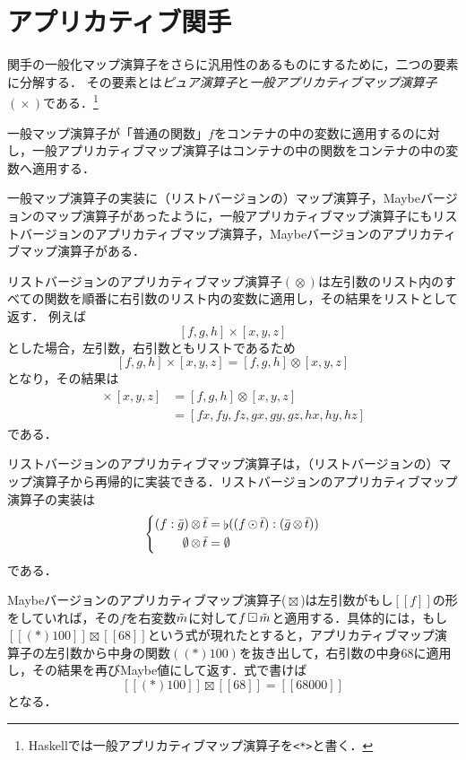 \documentclass[twocolumn]{jsbook}
\def\[{[\![}
\def\]{]\!]}
\newcommand{\keyword}[1]{{\emph{#1}}}
\newcommand{\code}[1]{\texttt{#1}}
\DeclareMathOperator{\hsklApplicativeMap}{\times}
\DeclareMathOperator{\hsklApplicativeListMap}{\otimes}
\DeclareMathOperator{\hsklApplicativeMaybeMap}{\boxtimes}
\DeclareMathOperator{\hsklConcat}{\flat}
\DeclareMathOperator{\hsklMap}{\odot}
\DeclareMathOperator{\hsklMaybeMap}{\boxdot}
\newcommand{\hsklEmptyList}{\emptyset}
\newcommand{\hsklJust}[1]{\[#1\]}
\newcommand{\hsklList}[1]{\Bar{#1}}
\newcommand{\hsklMaybe}[1]{\Tilde{#1}}
\begin{document}
\section{アプリカティブ関手}

関手の一般化マップ演算子をさらに汎用性のあるものにするために，二つの要素に分解する．
その要素とは\keyword{ピュア演算子}と\keyword{一般アプリカティブマップ演算子} $(\hsklApplicativeMap)$である．\footnote{Haskellでは一般アプリカティブマップ演算子を\code{<*>}と書く．}

一般マップ演算子が「普通の関数」$f$をコンテナの中の変数に適用するのに対し，一般アプリカティブマップ演算子はコンテナの中の関数をコンテナの中の変数へ適用する．

一般マップ演算子の実装に（リストバージョンの）マップ演算子，Maybeバージョンのマップ演算子があったように，一般アプリカティブマップ演算子にもリストバージョンのアプリカティブマップ演算子，Maybeバージョンのアプリカティブマップ演算子がある．

リストバージョンのアプリカティブマップ演算子$(\hsklApplicativeListMap)$は左引数のリスト内のすべての関数を順番に右引数のリスト内の変数に適用し，その結果をリストとして返す．
例えば$$[f,g,h]\hsklApplicativeMap[x,y,z]$$とした場合，左引数，右引数ともリストであるため$$[f,g,h]\hsklApplicativeMap[x,y,z]=[f,g,h]\hsklApplicativeListMap[x,y,z]$$となり，その結果は
\begin{align*}
[f,g,h]\hsklApplicativeMap[x,y,z]&=[f,g,h]\hsklApplicativeListMap[x,y,z]\\
&=[fx,fy,fz,gx,gy,gz,hx,hy,hz]
\end{align*}
である．

リストバージョンのアプリカティブマップ演算子は，（リストバージョンの）マップ演算子から再帰的に実装できる．リストバージョンのアプリカティブマップ演算子の実装は
\begin{equation*}
\left\{
\begin{split}
(f:\hsklList{g})\hsklApplicativeListMap\hsklList{t}&=\hsklConcat((f\hsklMap\hsklList{t}):(\hsklList{g}\hsklApplicativeListMap\hsklList{t}))\\
\hsklEmptyList\hsklApplicativeListMap\hsklList{t}&=\hsklEmptyList
\end{split}
\right.
\end{equation*}
である．

Maybeバージョンのアプリカティブマップ演算子($\hsklApplicativeMaybeMap$)は左引数がもし$\hsklJust{f}$の形をしていれば，その$f$を右変数$\hsklMaybe{m}$に対して$f\hsklMaybeMap\hsklMaybe{m}$と適用する．具体的には，もし$\hsklJust{(*)100}\hsklApplicativeMaybeMap{}\hsklJust{68}$という式が現れたとすると，アプリカティブマップ演算子の左引数から中身の関数$((*)100)$を抜き出して，右引数の中身$68$に適用し，その結果を再びMaybe値にして返す．式で書けば$$\hsklJust{(*)100}\hsklApplicativeMaybeMap{}\hsklJust{68}=\hsklJust{68000}$$となる．
\end{document}
